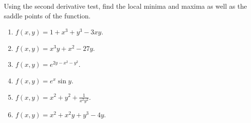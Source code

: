 Using the second derivative test, find the local minima and maxima as well as the saddle points of the function. 


\begin{enumerate}
\item $f(x,y)= 1+x^3+y^3-3x y$.   


\item $f(x,y)= x^3y+x^2-27y$.
\item $f(x,y)=e^{2y-x^2-y^2}$.
\item $f(x,y)=e^x\sin y$.
\item $f(x,y) =x^2+ y^2+ \frac{ 1}{ x^2y^2}$.
\item \label{problemextremax^2+x^2y+y^3-2y} $f(x,y)=x^2+ x^2y+y^3-4y$.

\end{enumerate}